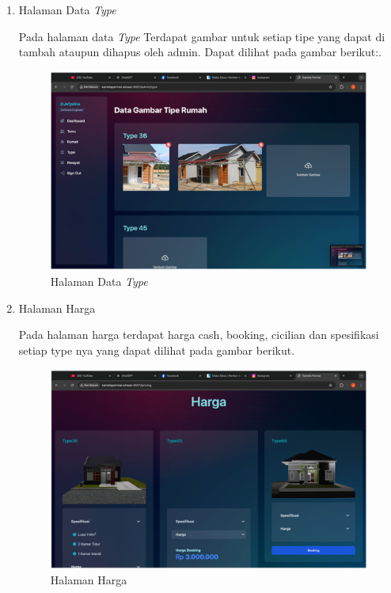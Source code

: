 \begin{enumerate}
    \item Halaman Data \textit{Type}
    \par Pada halaman data \textit{Type} Terdapat gambar untuk setiap tipe yang dapat di tambah ataupun dihapus oleh admin. Dapat dilihat pada gambar berikut:.
    \begin{figure}
        \centering
        \includegraphics[width=0.75\linewidth]{Implementasi/Data Type.png}
        \caption{Halaman Data \textit{Type}}
    \end{figure}
    
    \item Halaman Harga
    \par Pada halaman harga terdapat harga cash, booking, cicilian dan spesifikasi setiap type nya yang dapat dilihat pada gambar berikut.
    \begin{figure}
        \centering
        \includegraphics[width=0.75\linewidth]{Implementasi/Harga.png}
        \caption{Halaman Harga}
    \end{figure}
    

\end{enumerate}

